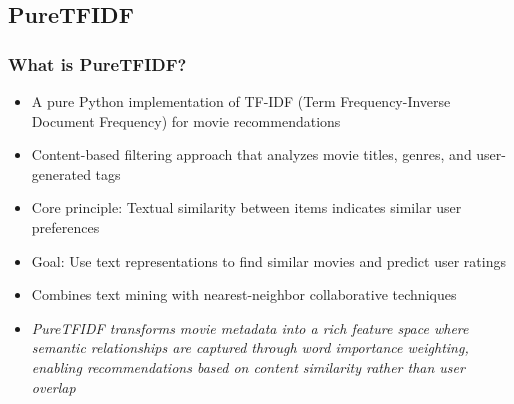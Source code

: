 \documentclass{beamer}
\begin{document}
\subsection{PureTFIDF}
\begin{frame}
\frametitle{What is PureTFIDF?}

\begin{itemize}
    \item A pure Python implementation of TF-IDF (Term Frequency-Inverse Document Frequency) for movie recommendations
    \item Content-based filtering approach that analyzes movie titles, genres, and user-generated tags
    \item Core principle: Textual similarity between items indicates similar user preferences
    \item Goal: Use text representations to find similar movies and predict user ratings
    \item Combines text mining with nearest-neighbor collaborative techniques
    
    \vspace{1cm}

    \item \textit{PureTFIDF transforms movie metadata into a rich feature space where semantic relationships are captured through word importance weighting, enabling recommendations based on content similarity rather than user overlap}
\end{itemize}
\end{frame}
\end{document}
